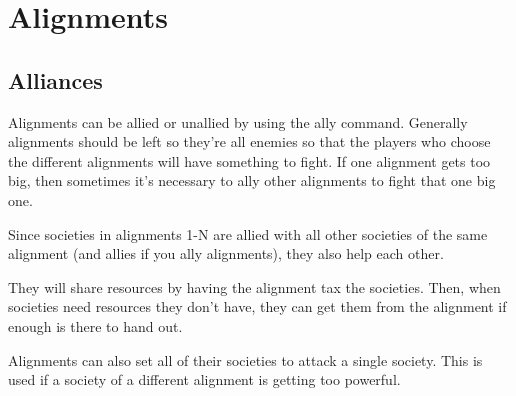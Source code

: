 \chapter{Alignments}

\section{Alliances}

Alignments can be allied or unallied by using the ally command.
Generally alignments should be left so they're all enemies so
that the players who choose the different alignments will have
something to fight. If one alignment gets too big, then sometimes
it's necessary to ally other alignments to fight that one big one.

Since societies in alignments 1-N are allied with all other societies
of the same alignment (and allies if you ally alignments), they
also help each other.

They will share resources by having the alignment tax the societies.
Then, when societies need resources they don't have, they can get them
from the alignment if enough is there to hand out.

Alignments can also set all of their societies to attack a single
society. This is used if a society of a different alignment 
is getting too powerful.
